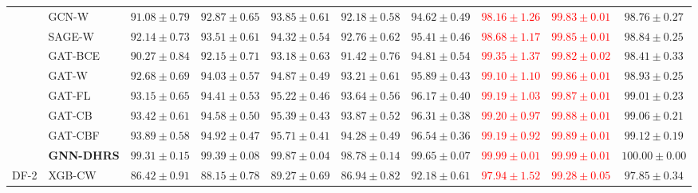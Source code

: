 \documentclass[pdflatex,sn-mathphys-num]{sn-jnl}%
\theoremstyle{thmstyleone}%
\theoremstyle{thmstyletwo}%
\theoremstyle{thmstylethree}%
\begin{document}
\begin{table}[!ht]
{\begin{tabular}{@{}llcccccccc@{}}
\addlinespace[1pt]

& GCN-W
& $91.08\pm0.79$
& $92.87\pm0.65$
& $93.85\pm0.61$
& $92.18\pm0.58$
& $94.62\pm0.49$
& \textcolor{red}{$98.16\pm1.26$}
& \textcolor{red}{$99.83\pm0.01$}
& $98.76\pm0.27$ \\

& SAGE-W
& $92.14\pm0.73$
& $93.51\pm0.61$
& $94.32\pm0.54$
& $92.76\pm0.62$
& $95.41\pm0.46$
& \textcolor{red}{$98.68\pm1.17$}
& \textcolor{red}{$99.85\pm0.01$}
& $98.84\pm0.25$ \\

\addlinespace[1pt]

& GAT-BCE
& $90.27\pm0.84$
& $92.15\pm0.71$
& $93.18\pm0.63$
& $91.42\pm0.76$
& $94.81\pm0.54$
& \textcolor{red}{$99.35\pm1.37$}
& \textcolor{red}{$99.82\pm0.02$}
& $98.41\pm0.33$ \\

& GAT-W
& $92.68\pm0.69$
& $94.03\pm0.57$
& $94.87\pm0.49$
& $93.21\pm0.61$
& $95.89\pm0.43$
& \textcolor{red}{$99.10\pm1.10$}
& \textcolor{red}{$99.86\pm0.01$}
& $98.93\pm0.25$ \\

& GAT-FL
& $93.15\pm0.65$
& $94.41\pm0.53$
& $95.22\pm0.46$
& $93.64\pm0.56$
& $96.17\pm0.40$
& \textcolor{red}{$99.19\pm1.03$}
& \textcolor{red}{$99.87\pm0.01$}
& $99.01\pm0.23$ \\

& GAT-CB
& $93.42\pm0.61$
& $94.58\pm0.50$
& $95.39\pm0.43$
& $93.87\pm0.52$
& $96.31\pm0.38$
& \textcolor{red}{$99.20\pm0.97$}
& \textcolor{red}{$99.88\pm0.01$}
& $99.06\pm0.21$ \\

& GAT-CBF
& $93.89\pm0.58$
& $94.92\pm0.47$
& $95.71\pm0.41$
& $94.28\pm0.49$
& $96.54\pm0.36$
& \textcolor{red}{$99.19\pm0.92$}
& \textcolor{red}{$99.89\pm0.01$}
& $99.12\pm0.19$ \\

& \textbf{GNN-DHRS}
& \textbf{$99.31\pm0.15$}
& \textbf{$99.39\pm0.08$}
& \textbf{$99.87\pm0.04$}
& \textbf{$98.78\pm0.14$}
& \textbf{$99.65\pm0.07$}
& \textcolor{red}{\textbf{$99.99\pm0.01$}}
& \textcolor{red}{\textbf{$99.99\pm0.01$}}
& \textbf{$100.00\pm0.00$} \\

\midrule

\multirow{13}{*}{DF-2}

& XGB-CW
& $86.42\pm0.91$
& $88.15\pm0.78$
& $89.27\pm0.69$
& $86.94\pm0.82$
& $92.18\pm0.61$
& \textcolor{red}{$97.94\pm1.52$}
& \textcolor{red}{$99.28\pm0.05$}
& $97.85\pm0.34$ \\


\end{tabular}}
\end{table}
\end{document}
